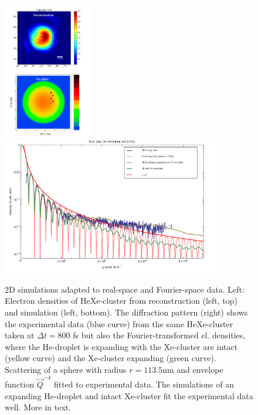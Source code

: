 \begin{figure}
	\centering
		\includegraphics[height=6.0cm]{images/results/HeXe-densities-113-05-doping-and-reconstruction.png}
		\includegraphics[height=6.0cm]{images/results/HeXe-cluster-113-0-5-doping.pdf}
	\caption[Simulation and exp. data: Structural damage in He-droplet.]{2D simulations adapted to real-space and Fourier-space data. Left: Electron densities of HeXe-cluster from reconstruction (left, top) and simulation (left, bottom). The diffraction pattern (right) shows the experimental data (blue curve) from the same HeXe-cluster taken at $\Delta t=800$ fs but also the Fourier-transformed el. densities, where the He-droplet is expanding with the Xe-cluster are intact (yellow curve) and the Xe-cluster expanding (green curve). Scattering of a sphere with radius $r=113.5$nm and envelope function $\vec{Q}^{-4}$ fitted to experimental data. The simulations of an expanding He-droplet and intact Xe-cluster fit the experimental data well. More in text.}
	\label{fig:HeXe-cluster-113-0.5}
\end{figure}
